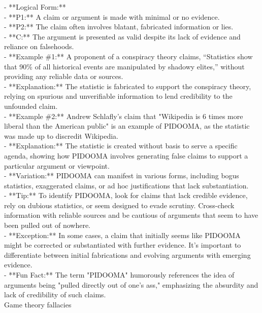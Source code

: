 \documentclass[a4paper,12pt,single,pdftex]{scrbook}
\begin{document}
    
      - **Logical Form:**
    \\

    
        - **P1:** A claim or argument is made with minimal or no evidence.
    \\

    
        - **P2:** The claim often involves blatant, fabricated information or lies.
    \\

    
        - **C:** The argument is presented as valid despite its lack of evidence and reliance on falsehoods.
    \\

    
      - **Example \#1:** A proponent of a conspiracy theory claims, “Statistics show that 90\% of all historical events are manipulated by shadowy elites,” without providing any reliable data or sources.
    \\

    
      - **Explanation:** The statistic is fabricated to support the conspiracy theory, relying on spurious and unverifiable information to lend credibility to the unfounded claim.
    \\

    
      - **Example \#2:** Andrew Schlafly’s claim that "Wikipedia is 6 times more liberal than the American public" is an example of PIDOOMA, as the statistic was made up to discredit Wikipedia.
    \\

    
      - **Explanation:** The statistic is created without basis to serve a specific agenda, showing how PIDOOMA involves generating false claims to support a particular argument or viewpoint.
    \\

    
      - **Variation:** PIDOOMA can manifest in various forms, including bogus statistics, exaggerated claims, or ad hoc justifications that lack substantiation.
    \\

    
      - **Tip:** To identify PIDOOMA, look for claims that lack credible evidence, rely on dubious statistics, or seem designed to evade scrutiny. Cross-check information with reliable sources and be cautious of arguments that seem to have been pulled out of nowhere.
    \\

    
      - **Exception:** In some cases, a claim that initially seems like PIDOOMA might be corrected or substantiated with further evidence. It's important to differentiate between initial fabrications and evolving arguments with emerging evidence.
    \\

    
      - **Fun Fact:** The term "PIDOOMA" humorously references the idea of arguments being "pulled directly out of one's ass," emphasizing the absurdity and lack of credibility of such claims.
    \\

  

Game theory fallacies
\end{document}
